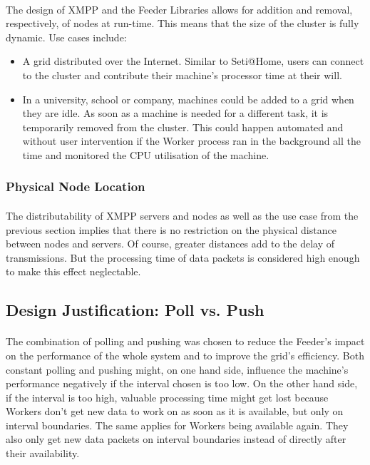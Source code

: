 \paragraph{}
The design of XMPP and the Feeder Libraries allows for addition and removal, respectively, of nodes at run-time. This means that the size of the cluster is fully dynamic. Use cases include:
\begin{itemize}
\item A grid distributed over the Internet. Similar to Seti@Home, users can connect to the cluster and contribute their machine's processor time at their will.
\item In a university, school or company, machines could be added to a grid when they are idle. As soon as a machine is needed for a different task, it is temporarily removed from the cluster. This could happen automated and without user intervention if the Worker process ran in the background all the time and monitored the CPU utilisation of the machine.
\end{itemize}

\subsubsection{Physical Node Location}
\paragraph{}
The distributability of XMPP servers and nodes as well as the use case from the previous section implies that there is no restriction on the physical distance between nodes and servers. Of course, greater distances add to the delay of transmissions. But the processing time of data packets is considered high enough to make this effect neglectable.

\subsection{Design Justification: Poll vs. Push}
\label{sec:designjustification}
\paragraph{}
The combination of polling and pushing was chosen to reduce the Feeder's impact on the performance of the whole system and to improve the grid's efficiency. Both constant polling and pushing might, on one hand side, influence the machine's performance negatively if the interval chosen is too low. On the other hand side, if the interval is too high, valuable processing time might get lost because Workers don't get new data to work on as soon as it is available, but only on interval boundaries. The same applies for Workers being available again. They also only get new data packets on interval boundaries instead of directly after their availability.

